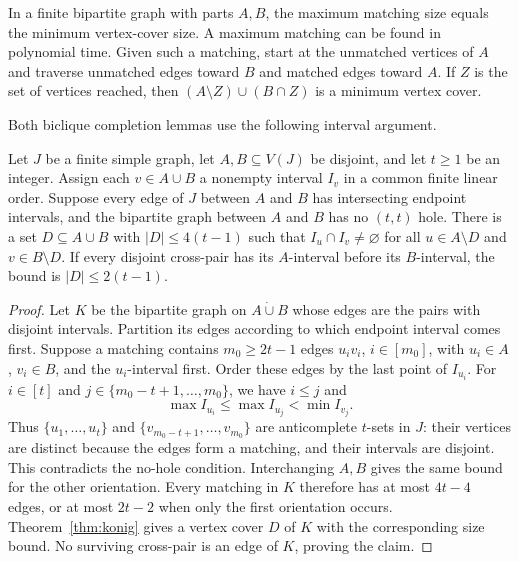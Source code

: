 \begin{theorem}
\label{thm:konig}
In a finite bipartite graph with parts $A,B$, the maximum matching
size equals the minimum vertex-cover size. A maximum matching can
be found in polynomial time. Given such a matching, start at the
unmatched vertices of $A$ and traverse unmatched edges toward $B$
and matched edges toward $A$. If $Z$ is the set of vertices reached,
then $(A\setminus Z)\cup(B\cap Z)$ is a minimum vertex cover.
\end{theorem}

Both biclique completion lemmas use the following interval argument.

\begin{lemma}\label{lem:interval-completion}
Let $J$ be a finite simple graph, let $A,B\subseteq V(J)$ be disjoint,
and let $t\ge1$ be an integer. Assign each $v\in A\cup B$ a nonempty interval
$I_v$ in a common finite linear order. Suppose every edge of $J$
between $A$ and $B$ has intersecting endpoint intervals, and the
bipartite graph between $A$ and $B$ has no $(t,t)$ hole.
There is a set $D\subseteq A\cup B$ with $|D|\le4(t-1)$ such that
$I_u\cap I_v\ne\varnothing$ for all $u\in A\setminus D$ and
$v\in B\setminus D$. If every disjoint cross-pair has its $A$-interval
before its $B$-interval, the bound is $|D|\le2(t-1)$.
\end{lemma}

\begin{proof}
Let $K$ be the bipartite graph on $A\mathbin{\dot\cup}B$ whose edges
are the pairs with disjoint intervals. Partition its edges according
to which endpoint interval comes first.
Suppose a matching contains $m_0\ge2t-1$ edges $u_iv_i$, $i\in[m_0]$, with
$u_i\in A$, $v_i\in B$, and the $u_i$-interval first. Order these
edges by the last point of $I_{u_i}$. For $i\in[t]$ and
$j\in\{m_0-t+1,\ldots,m_0\}$, we have $i\le j$ and
\[
 \max I_{u_i}\le\max I_{u_j}<\min I_{v_j}.
\]
Thus $\{u_1,\ldots,u_t\}$ and
$\{v_{m_0-t+1},\ldots,v_{m_0}\}$ are anticomplete $t$-sets in $J$:
their vertices are distinct because the edges form a matching, and
their intervals are disjoint. This contradicts the no-hole condition.
Interchanging $A,B$ gives the same bound for the other orientation.
Every matching in $K$ therefore has at most $4t-4$ edges, or at most
$2t-2$ when only the first orientation occurs. Theorem~\ref{thm:konig}
gives a vertex cover $D$ of $K$ with the corresponding size bound.
No surviving cross-pair is an edge of $K$, proving the claim.
\end{proof}

